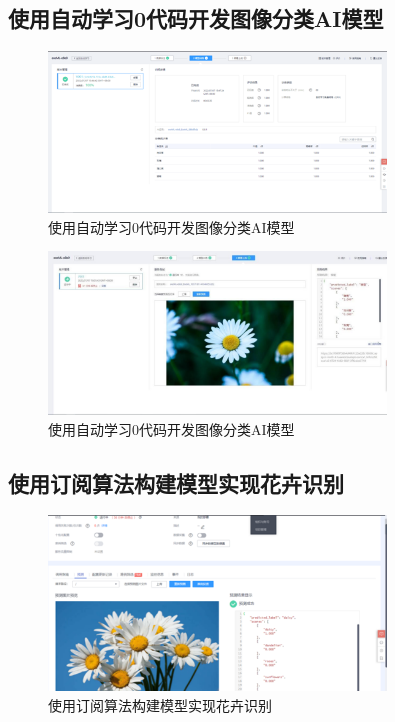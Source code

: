 \documentclass[a4paper,twoside,zihao=5,UTF8]{ctexart}
\begin{document}
\begin{spacing}{1.2}
\subsection{使用自动学习0代码开发图像分类AI模型}

\begin{figure}[H]
	\centering
	\caption{使用自动学习0代码开发图像分类AI模型}
	\label{fig:ai31}
	\includegraphics[width=0.8\textwidth]{task3_1.png}
\end{figure}

\begin{figure}[H]
	\centering
	\caption{使用自动学习0代码开发图像分类AI模型}
	\label{fig:ai32}
	\includegraphics[width=0.8\textwidth]{task3_2.jpg}
\end{figure}

\subsection{使用订阅算法构建模型实现花卉识别}

\begin{figure}[H]
	\centering
	\caption{使用订阅算法构建模型实现花卉识别}
	\label{fig:ai41}
	\includegraphics[width=0.8\textwidth]{task4.png}
\end{figure}


\end{spacing}
\end{document}
